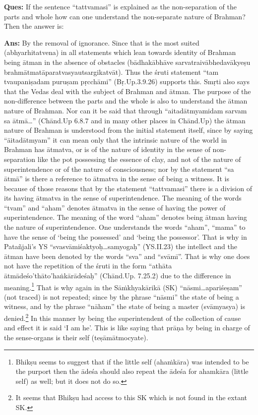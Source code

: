 \textbf{Ques:} If the sentence “tattvamasi” is explained as the non-separation of the parts and whole how can one understand the non-separate nature of Brahman? Then the answer is: 

\textbf{Ans:} By the removal of ignorance. Since that is the most suited (abhyarhitatvena) in all statements which lean towards identity of Brahman being ātman in the absence of obstacles (bādhakābhāve sarvatraivābhedavākyeṣu brahmātmatāparatvasyautsargikatvāt). Thus the śruti statement “tam tvaupaniṣadam puruṣam pṛcchāmi” (Bṛ.Up.3.9.26) supports this. Smṛti also says that the Vedas deal with the subject of Brahman and ātman. The purpose of the non-difference between the parts and the whole is also to understand the ātman nature of Brahman. Nor can it be said that through “aitadātmyamidam sarvam sa ātmā…” (Chānd.Up 6.8.7 and in many other places in Chānd.Up) the ātman nature of Brahman is understood from the initial statement itself, since by saying “āitadātmyam” it can mean only that the intrinsic nature of the world in Brahman has ātmatva, or is of the nature of identity in the sense of non-separation like the pot possessing the essence of clay, and not of the nature of superintendence or of the nature of consciousness; nor by the statement “sa ātmā” is there a reference to ātmatva in the sense of being a witness. It is because of those reasons that by the statement “tattvamasi” there is a division of its having ātmatva in the sense of superintendence. The meaning of the words “tvam” and “aham” denotes ātmatva in the sense of having the power of superintendence. The meaning of the word “aham” denotes being ātman having the nature of superintendence. One understands the words “aham”, “mama” to have the sense of ‘being the possessed’ and ‘being the possessor’. That is why in Patañjali’s YS “svasvāmiśaktyoḥ…samyogaḥ” (YS.II.23) the intellect and the ātman have been denoted by the words “sva” and “svāmī”. That is why one does not have the repetition of the śruti in the form “athāta ātmādeśo’thāto’haṅkārādeśaḥ” (Chānd.Up. 7.25.2) due to the difference in meaning.\footnote{Bhikṣu seems to suggest that if the little self (ahaṁkāra) was intended to be the purport then the ādeśa should also repeat the ādeśa for ahamkāra (little self) as well; but it does not do so.} That is why again in the Sāṁkhyakārikā (SK) “nāsmi…\-apariśeṣam” (not traced) is not repeated; since by the phrase “nāsmi” the state of being a witness, and by the phrase “nāham” the state of being a master (svāmyasya) is denied.\footnote{It seems that Bhikṣu had access to this SK which is not found in the extant SK.} In this manner by being the superintendent of the collection of cause and effect it is said ‘I am he’. This is like saying that prāṇa by being in charge of the sense-organs is their self (teṣāmātmocyate). 

